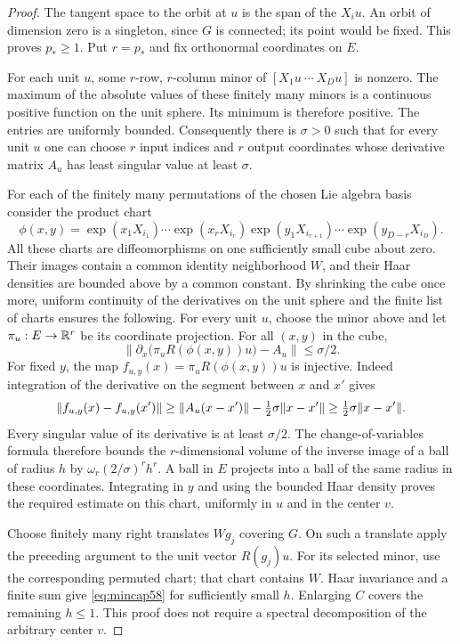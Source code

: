 \begin{proof}
The tangent space to the orbit at $u$ is the span of the $X_i u$.
An orbit of dimension zero is a singleton, since $G$ is connected; its
point would be fixed. This proves $p_*\ge1$. Put $r=p_*$ and fix
orthonormal coordinates on $E$.

For each unit $u$, some $r$-row, $r$-column minor of
$[X_1u\ \cdots\ X_Du]$ is nonzero. The maximum of the absolute values
of these finitely many minors is a continuous positive function on the
unit sphere. Its minimum is therefore positive. The entries are uniformly
bounded. Consequently there is $\sigma>0$ such that for every unit $u$
one can choose $r$ input indices and $r$ output coordinates whose derivative
matrix $A_u$ has least singular value at least $\sigma$.

For each of the finitely many permutations of the chosen Lie algebra
basis consider the product chart
\[
 \phi(x,y)=\exp(x_1X_{i_1})\cdots\exp(x_rX_{i_r})
            \exp(y_1X_{i_{r+1}})\cdots\exp(y_{D-r}X_{i_D}).
\]
All these charts are diffeomorphisms on one sufficiently small cube about
zero. Their images contain a common identity neighborhood $W$, and their
Haar densities are bounded above by a common constant. By shrinking the
cube once more, uniform continuity of the derivatives on the unit sphere
and the finite list of charts ensures the following. For every unit $u$,
choose the minor above and let $\pi_u:E\to\mathbb R^r$ be its coordinate
projection. For all $(x,y)$ in the cube,
\begin{equation}\label{eq:submersion58}
 \left\|\partial_x\bigl(\pi_u R(\phi(x,y))u\bigr)-A_u\right\|
                                                    \le\sigma/2.
\end{equation}
For fixed $y$, the map $f_{u,y}(x)=\pi_u R(\phi(x,y))u$ is injective.
Indeed integration of the derivative on the segment between $x$ and
$x'$ gives
\[
 \lVert f_{u,y}(x)-f_{u,y}(x')\rVert
       \ge\lVert A_u(x-x')\rVert-\tfrac12\sigma\lVert x-x'\rVert
       \ge\tfrac12\sigma\lVert x-x'\rVert.
\]
Every singular value of its derivative is at least $\sigma/2$.
The change-of-variables formula therefore bounds the $r$-dimensional
volume of the inverse image of a ball of radius $h$ by
$\omega_r(2/\sigma)^r h^r$. A ball in $E$ projects into a ball of the
same radius in these coordinates. Integrating in $y$ and using the bounded
Haar density proves the required estimate on this chart, uniformly in
$u$ and in the center $v$.

Choose finitely many right translates $Wg_j$ covering $G$. On such a
translate apply the preceding argument to the unit vector $R(g_j)u$.
For its selected minor, use the corresponding permuted chart; that chart
contains $W$. Haar invariance and a finite sum give \eqref{eq:mincap58}
for sufficiently small $h$. Enlarging $C$ covers the remaining
$h\le1$. This proof does not require a spectral decomposition of the
arbitrary center $v$.


\end{proof}

